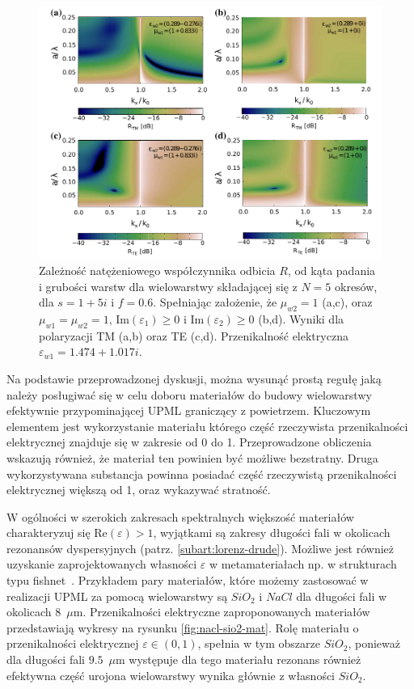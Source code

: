 \begin{figure}[tb]
	\includegraphics[width=\textwidth]{images/pml/fig5.png}
	\caption{Zależność natężeniowego współczynnika odbicia $R$, od kąta padania i grubości warstw dla wielowarstwy składającej się z $N=5$ okresów, dla $s=1+5i$ i $f=0.6$. Spełniając założenie, że $\mu_{w2}=1$ (a,c), oraz $\mu_{w1}=\mu_{w2}=1$, $\textrm{Im}(\varepsilon_1)\ge 0 $ i $\textrm{Im}(\varepsilon_2)\ge 0 $ (b,d). Wyniki dla polaryzacji TM (a,b) oraz TE (c,d). Przenikalność elektryczna $\varepsilon_{w1}=1.474+1.017i$.}
	\label{fig:pml-real-ref}
\end{figure}


Na podstawie przeprowadzonej dyskusji, można wysunąć prostą regułę jaką należy posługiwać się w celu doboru materiałów do budowy wielowarstwy efektywnie przypominającej UPML graniczący z powietrzem. Kluczowym elementem jest wykorzystanie materiału którego część rzeczywista przenikalności elektrycznej znajduje się w zakresie od 0 do 1. Przeprowadzone obliczenia wskazują również, że materiał ten powinien być możliwe bezstratny. Druga wykorzystywana substancja powinna posiadać część rzeczywistą przenikalności elektrycznej większą od 1, oraz wykazywać stratność. 

W ogólności w szerokich zakresach spektralnych większość materiałów charakteryzuj się $\textrm{Re}(\varepsilon) > 1$, wyjątkami są zakresy długości fali w okolicach rezonansów dyspersyjnych (patrz. \ref{subart:lorenz-drude}). Możliwe jest również uzyskanie zaprojektowanych własności $\varepsilon$ w metamateriałach np. w strukturach typu fishnet~\cite{valentine2008three}. Przykładem pary materiałów, które możemy zastosować w realizacji UPML za pomocą wielowarstwy są $SiO_2$ i $NaCl$ dla długości fali w okolicach 8~$\mu$m. Przenikalności elektryczne zaproponowanych materiałów przedstawiają wykresy na rysunku \ref{fig:nacl-sio2-mat}. Rolę materiału o przenikalności elektrycznej $\varepsilon \in (0,1)$, spełnia w tym obszarze $SiO_2$, ponieważ dla długości fali $9.5$~$\mu$m występuje dla tego materiału rezonans również efektywna część urojona wielowarstwy wynika głównie z własności $SiO_2$. 

